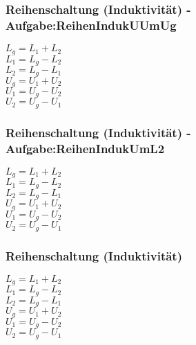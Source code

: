 \subsubsection{Reihenschaltung (Induktivität) - Aufgabe:ReihenIndukUUmUg} 
\begin{minipage}{0.45\textwidth} 
$ L_{g}  = L_{1}  + L_{2} $\\ 
$ L_{1}  = L_{g}  - L_{2} $\\ 
$ L_{2}  = L_{g}  - L_{1} $\\ 
$ U_{g}  = U_{1}  + U_{2} $\\ 
$ U_{1}  = U_{g}  - U_{2} $\\ 
$ U_{2}  = U_{g}  - U_{1} $\\ 
\end{minipage} 
\begin{minipage}{0.45\textwidth} 
 
\end{minipage} 
\subsubsection{Reihenschaltung (Induktivität) - Aufgabe:ReihenIndukUmL2} 
\begin{minipage}{0.45\textwidth} 
$ L_{g}  = L_{1}  + L_{2} $\\ 
$ L_{1}  = L_{g}  - L_{2} $\\ 
$ L_{2}  = L_{g}  - L_{1} $\\ 
$ U_{g}  = U_{1}  + U_{2} $\\ 
$ U_{1}  = U_{g}  - U_{2} $\\ 
$ U_{2}  = U_{g}  - U_{1} $\\ 
\end{minipage} 
\begin{minipage}{0.45\textwidth} 
 
\end{minipage} 
\subsubsection{Reihenschaltung (Induktivität)} 
\begin{minipage}{0.45\textwidth} 
$ L_{g}  = L_{1}  + L_{2} $\\ 
$ L_{1}  = L_{g}  - L_{2} $\\ 
$ L_{2}  = L_{g}  - L_{1} $\\ 
$ U_{g}  = U_{1}  + U_{2} $\\ 
$ U_{1}  = U_{g}  - U_{2} $\\ 
$ U_{2}  = U_{g}  - U_{1} $\\ 
\end{minipage} 
\begin{minipage}{0.45\textwidth} 
 
\end{minipage} 

